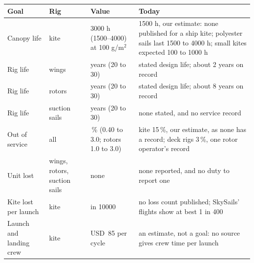 \begin{tabular}{@{}>{\raggedright\arraybackslash}p{}>{\raggedright\arraybackslash}p{}>{\raggedright\arraybackslash}p{}>{\raggedright\arraybackslash}p{}@{}}
\toprule
Goal & Rig & Value & Today \\
\midrule
Canopy life & kite & \num{3000} h (\numrange{1500}{4000}) at 100 g/m$^2$ & \num{1500} h, our estimate: none published for a ship kite; polyester sails last 1500 to 4000 h; small kites expected 100 to \num{1000} h \\\addlinespace
Rig life & wings & 25 years (20 to 30) & stated design life; about 2 years on record \\\addlinespace
Rig life & rotors & 25 years (20 to 30) & stated design life; about 8 years on record \\\addlinespace
Rig life & suction sails & 25 years (20 to 30) & none stated, and no service record \\\addlinespace
Out of service & all & 3\,\% (0.40 to 3.0; rotors 1.0 to 3.0) & kite 15\,\%, our estimate, as none has a record; deck rigs 3\,\%, one rotor operator's record \\\addlinespace
Unit lost & wings, rotors, suction sails & none & none reported, and no duty to report one \\\addlinespace
Kite lost per launch & kite & 1 in \num{10000} & no loss count published; SkySails' flights show at best 1 in \num{400} \\\addlinespace
Launch and landing crew & kite & USD~85 per cycle & an estimate, not a goal: no source gives crew time per launch \\
\bottomrule
\end{tabular}
